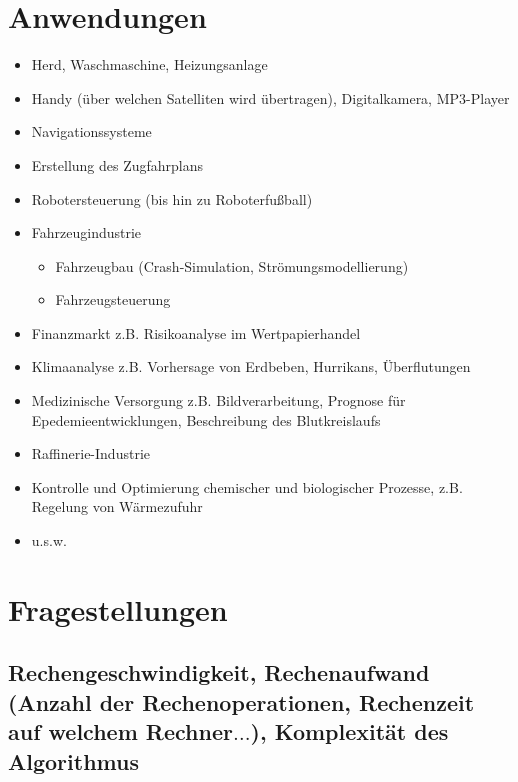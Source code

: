\documentclass[ngerman,fontsize=11pt, paper=a4, parskip=half, titlepage=true, toc=bib]{scrbook}
\begin{document}
\section{Anwendungen}
\begin{itemize}
\item Herd, Waschmaschine, Heizungsanlage
\item Handy (über welchen Satelliten wird übertragen),
  Digitalkamera, MP3-Player
\item Navigationssysteme
\item Erstellung des Zugfahrplans
\item Robotersteuerung (bis hin zu Roboterfußball)
\item Fahrzeugindustrie
  \begin{itemize}
  \item Fahrzeugbau (Crash-Simulation,
    Strömungsmodellierung)
  \item Fahrzeugsteuerung
  \end{itemize}
\item Finanzmarkt z.B. Risikoanalyse im Wertpapierhandel
\item Klimaanalyse z.B. Vorhersage von Erdbeben, Hurrikans,
  Überflutungen
\item Medizinische Versorgung z.B. Bildverarbeitung, Prognose
  für Epedemieentwicklungen, Beschreibung des Blutkreislaufs
\item Raffinerie-Industrie
\item Kontrolle und Optimierung chemischer und biologischer
  Prozesse, z.B. Regelung von Wärmezufuhr
\item u.s.w.
\end{itemize}

\section*{Fragestellungen}
\subsection*{Rechengeschwindigkeit, Rechenaufwand (Anzahl der
  Rechenoperationen, Rechenzeit auf welchem Rechner$\dots$),
  Komplexität des Algorithmus}
\end{document}

